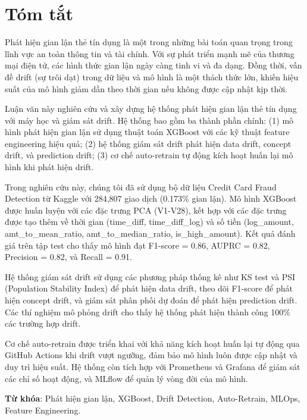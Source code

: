 \chapter*{Tóm tắt}

Phát hiện gian lận thẻ tín dụng là một trong những bài toán quan trọng trong lĩnh vực an toàn thông tin và tài chính. Với sự phát triển mạnh mẽ của thương mại điện tử, các hình thức gian lận ngày càng tinh vi và đa dạng. Đồng thời, vấn đề drift (sự trôi dạt) trong dữ liệu và mô hình là một thách thức lớn, khiến hiệu suất của mô hình giảm dần theo thời gian nếu không được cập nhật kịp thời.

Luận văn này nghiên cứu và xây dựng hệ thống phát hiện gian lận thẻ tín dụng với máy học và giám sát drift. Hệ thống bao gồm ba thành phần chính: (1) mô hình phát hiện gian lận sử dụng thuật toán XGBoost với các kỹ thuật feature engineering hiệu quả; (2) hệ thống giám sát drift phát hiện data drift, concept drift, và prediction drift; (3) cơ chế auto-retrain tự động kích hoạt huấn lại mô hình khi phát hiện drift.

Trong nghiên cứu này, chúng tôi đã sử dụng bộ dữ liệu Credit Card Fraud Detection từ Kaggle với 284,807 giao dịch (0.173\% gian lận). Mô hình XGBoost được huấn luyện với các đặc trưng PCA (V1-V28), kết hợp với các đặc trưng được tạo thêm về thời gian (time\_diff, time\_diff\_log) và số tiền (log\_amount, amt\_to\_mean\_ratio, amt\_to\_median\_ratio, is\_high\_amount). Kết quả đánh giá trên tập test cho thấy mô hình đạt F1-score = 0.86, AUPRC = 0.82, Precision = 0.82, và Recall = 0.91.

Hệ thống giám sát drift sử dụng các phương pháp thống kê như KS test và PSI (Population Stability Index) để phát hiện data drift, theo dõi F1-score để phát hiện concept drift, và giám sát phân phối dự đoán để phát hiện prediction drift. Các thí nghiệm mô phỏng drift cho thấy hệ thống phát hiện thành công 100\% các trường hợp drift.

Cơ chế auto-retrain được triển khai với khả năng kích hoạt huấn lại tự động qua GitHub Actions khi drift vượt ngưỡng, đảm bảo mô hình luôn được cập nhật và duy trì hiệu suất. Hệ thống còn tích hợp với Prometheus và Grafana để giám sát các chỉ số hoạt động, và MLflow để quản lý vòng đời của mô hình.

\textbf{Từ khóa}: Phát hiện gian lận, XGBoost, Drift Detection, Auto-Retrain, MLOps, Feature Engineering.